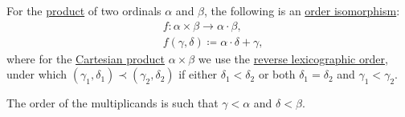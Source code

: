 \begin{proposition}\label{thm:ordinal_multiplication_cartesian_product}
  For the \hyperref[def:ordinal_arithmetic/multiplication]{product} of two ordinals \( \alpha \) and \( \beta \), the following is an \hyperref[def:partially_ordered_set/morphism]{order isomorphism}:
  \begin{equation*}
    \begin{aligned}
      &f: \alpha \times \beta \to \alpha \cdot \beta, \\
      &f(\gamma, \delta) \coloneqq \alpha \cdot \delta + \gamma,
    \end{aligned}
  \end{equation*}
  where for the \hyperref[def:cartesian_product]{Cartesian product} \( \alpha \times \beta \) we use the \hyperref[def:lexicographic_order]{reverse lexicographic order}, under which \( (\gamma_1, \delta_1) \prec (\gamma_2, \delta_2) \) if either \( \delta_1 < \delta_2 \) or both \( \delta_1 = \delta_2 \) and \( \gamma_1 < \gamma_2 \).
\end{proposition}
\begin{comments}
  \item The order of the multiplicands is such that \( \gamma < \alpha \) and \( \delta < \beta \).
\end{comments}
